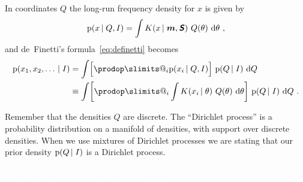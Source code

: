\documentclass[\ifafour a4paper,12pt,\else a5paper,10pt,\fi%
onecolumn,oneside,article,%
british%
]{memoir}
\makeatletter
\theoremstyle{remark}
\theoremstyle{innote}
\def\sum{\DOTSI\sumop\slimits@}
\def\prod{\DOTSI\prodop\slimits@}
\newcommand*{\mathte}[1]{\textbf{\textit{\textsf{#1}}}}
\newcommand*{\de}{\partialup}%
\newcommand*{\di}{\mathrm{d}}%
\newcommand*{\pf}{\mathrm{p}}%
\newcommand*{\p}{\mathrm{P}}%
\renewcommand*{\|}[1][]{\nonscript\,#1\vert\nonscript\;\mathopen{}}
\renewcommand*{\=}{\TextOrMath\texteq\eq}
\newcommand*{\tsum}{\mathop{\textstyle\sum}\nolimits}
\newcommand*{\yf}{f}
\newcommand*{\yx}{x}
\newcommand*{\yN}{K}
\newcommand*{\ymu}{\bm{m}}
\newcommand*{\ysi}{\mathte{S}}
\newcommand*{\yq}{\bm{q}}
\newcommand*{\yQ}{Q}
\makeatother
\begin{document}
In coordinates $\yQ$ the long-run frequency density
for $\yx$ is given by
\begin{equation}
  \label{eq:freq_coords_f}
  \pf(\yx \| \yQ, I) =
  \int \yN(\yx \| \ymu, \ysi)\ \yQ(\theta)
  \ \di\theta\ ,
\end{equation}
and de~Finetti's formula~\eqref{eq:definetti} becomes
\begin{equation}
  \label{eq:definetti_Q}
  \begin{split}
  \pf(\yx_{1},\yx_{2},\dotsc \| I) &=
  \int \Bigl[\prod_{i}\pf(\yx_{i} \| \yQ, I)\Bigr] \
  \pf(\yQ \| I)\ \di\yQ
\\
&\equiv \int \biggl[\prod_{i}
\int \yN(\yx_{i} \| \theta)\ \yQ(\theta)
  \ \di\theta
\biggr] \
  \pf(\yQ \| I)\ \di\yQ\ .
\end{split}
\end{equation}

Remember that the densities $\yQ$ are discrete. The \enquote{Dirichlet
  process} is a probability distribution on a manifold of densities, with
support over discrete densities. When we use mixtures of Dirichlet
processes we are stating that our prior density $\pf(\yQ \| I)$ is a
Dirichlet process.

\textcolor{white}{If you find this you can claim a postcard from me.}





\end{document}
